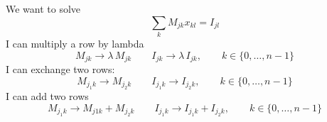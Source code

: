 \documentclass{article}
\begin{document}
We want to solve
$$
\sum_k M_{jk}x_{kl} = I_{jl}
$$
I can multiply a row by lambda
$$
M_{jk} \to \lambda \,M_{jk}\qquad I_{jk} \to \lambda \,I_{jk},\qquad k\in \{0,\dots,n-1\}
$$
I can exchange two rows:
$$
M_{j_1k} \to M_{j_2k}\qquad I_{j_1k} \to I_{j_2k},\qquad k\in \{0,\dots,n-1\}
$$
I can add two rows
$$
M_{j_1k} \to M_{j1k}+M_{j_2k}\qquad I_{j_1k} \to I_{j_1k}+I_{j_2k},\qquad k\in \{0,\dots,n-1\}
$$
\end{document}
